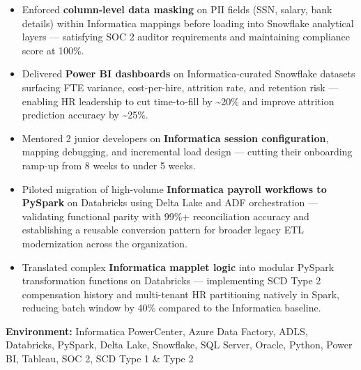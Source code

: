 \documentclass[a4paper,10pt]{article}
\begin{document}
\begin{itemize}
    \item Enforced \textbf{column-level data masking} on PII fields (SSN, salary, bank details) within Informatica mappings before loading into Snowflake analytical layers — satisfying SOC 2 auditor requirements and maintaining compliance score at 100\%.
    \item Delivered \textbf{Power BI dashboards} on Informatica-curated Snowflake datasets surfacing FTE variance, cost-per-hire, attrition rate, and retention risk — enabling HR leadership to cut time-to-fill by \textasciitilde 20\% and improve attrition prediction accuracy by \textasciitilde 25\%.
    \item Mentored 2 junior developers on \textbf{Informatica session configuration}, mapping debugging, and incremental load design — cutting their onboarding ramp-up from 8 weeks to under 5 weeks.
    \item Piloted migration of high-volume \textbf{Informatica payroll workflows to PySpark} on Databricks using Delta Lake and ADF orchestration — validating functional parity with 99\%+ reconciliation accuracy and establishing a reusable conversion pattern for broader legacy ETL modernization across the organization.
    \item Translated complex \textbf{Informatica mapplet logic} into modular PySpark transformation functions on Databricks — implementing SCD Type 2 compensation history and multi-tenant HR partitioning natively in Spark, reducing batch window by 40\% compared to the Informatica baseline.
\end{itemize}

\textbf{Environment:} Informatica PowerCenter, Azure Data Factory, ADLS, Databricks, PySpark, Delta Lake, Snowflake, SQL Server, Oracle, Python, Power BI, Tableau, SOC 2, SCD Type 1 \& Type 2
\end{document}
